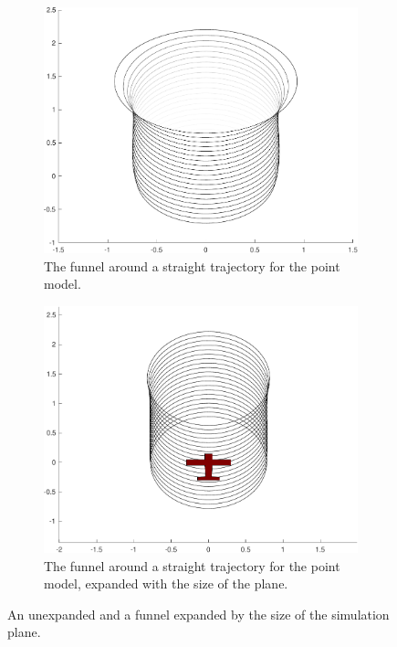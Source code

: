\begin{figure}
  \begin{subfigure}{0.5\textwidth}
    \includegraphics[width=.95\textwidth]{figures/experiments/unexpanded-funnel}
    \caption{The funnel around a straight trajectory for the point
      model.\newline}
  \end{subfigure}%
  \begin{subfigure}{0.5\textwidth}
    \includegraphics[width=.95\textwidth]{figures/experiments/expanded-funnel-with-plane}
    \caption{The funnel around a straight trajectory for the point model,
      expanded with the size of the plane.}
  \end{subfigure}
  \caption[An expanded and unexpanded experiment funnel]{An unexpanded and a funnel expanded by the size of the
    simulation plane.}
  \label{fig:expanded-and-unexpanded}
\end{figure}

